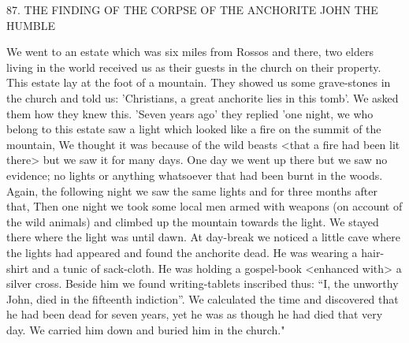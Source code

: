 87. THE FINDING OF THE CORPSE OF
THE ANCHORITE JOHN THE HUMBLE

We went to an estate which was six miles from Rossos and there,
two elders living in the world received us as their guests in the
church on their property. This estate lay at the foot of a mountain.
They showed us some grave-stones in the church and told us:
'Christians, a great anchorite lies in this tomb'. We asked them how
they knew this. 'Seven years ago' they replied 'one night, we who
belong to this estate saw a light which looked like a fire on the
summit of the mountain, We thought it was because of the wild
beasts <that a fire had been lit there> but we saw it for many days.
One day we went up there but we saw no evidence; no lights or
anything whatsoever that had been burnt in the woods. Again, the
following night we saw the same lights and for three months after
that, Then one night we took some local men armed with weapons
(on account of the wild animals) and climbed up the mountain
towards the light. We stayed there where the light was until dawn.
At day-break we noticed a little cave where the lights had appeared
and found the anchorite dead. He was wearing a hair-shirt and a
tunic of sack-cloth. He was holding a gospel-book <enhanced with>
a silver cross. Beside him we found writing-tablets inscribed thus: “I,
the unworthy John, died in the fifteenth indiction”. We calculated
the time and discovered that he had been dead for seven years, yet
he was as though he had died that very day. We carried him down
and buried him in the church."

